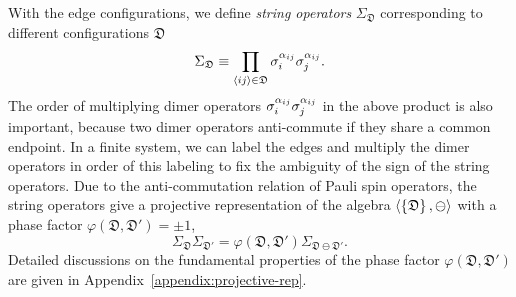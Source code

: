 With the edge configurations, we define \emph{string operators} $\Sigma_\mathfrak{D}$ corresponding to different configurations $\mathfrak{D}$
\begin{equation}\label{equ.string-operator-def}
    \Sigma_\mathfrak{D} \equiv \prod_{\left\langle ij \right\rangle\in \mathfrak{D}}\sigma^{\alpha_{ij}}_i\sigma_j^{\alpha_{ij}}.
\end{equation}
The order of multiplying dimer operators $\sigma^{\alpha_{i j}}_{i}\sigma^{\alpha_{i j}}_{j}$ in the above product is also important, because two dimer operators anti-commute if they share a common endpoint. In a finite system, we can label the edges and multiply the dimer operators in order of this labeling to fix the ambiguity of the sign of the string operators. Due to the anti-commutation relation of Pauli spin operators, the string operators give a projective representation of the algebra $\left\langle \left\{ \mathfrak{D} \right\},\ominus \right\rangle$ with a phase factor $\varphi(\mathfrak{D},\mathfrak{D}')=\pm 1$,
\begin{equation}\label{equ.Sigma-representation}
\Sigma_{\mathfrak{D}}\Sigma_{\mathfrak{D}'} = \varphi(\mathfrak{D},\mathfrak{D}') \Sigma_{\mathfrak{D}\ominus\mathfrak{D}'}.
\end{equation}
Detailed discussions on the fundamental properties of the phase factor $\varphi(\mathfrak{D},\mathfrak{D}')$ are given in Appendix~\ref{appendix:projective-rep}.

